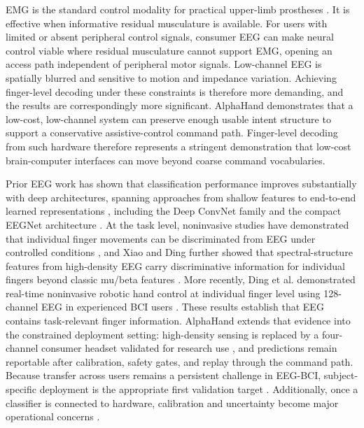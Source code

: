 \documentclass[conference]{IEEEtran}
\begin{document}
EMG is the standard control modality for practical upper-limb prostheses \cite{Scheme2011EMG}. It is effective when informative residual musculature is available. For users with limited or absent peripheral control signals, consumer EEG can make neural control viable where residual musculature cannot support EMG, opening an access path independent of peripheral motor signals. Low-channel EEG is spatially blurred and sensitive to motion and impedance variation. Achieving finger-level decoding under these constraints is therefore more demanding, and the results are correspondingly more significant. AlphaHand demonstrates that a low-cost, low-channel system can preserve enough usable intent structure to support a conservative assistive-control command path. Finger-level decoding from such hardware therefore represents a stringent demonstration that low-cost brain-computer interfaces \cite{Wolpaw2002BCI} can move beyond coarse command vocabularies.

Prior EEG work has shown that classification performance improves substantially with deep architectures, spanning approaches from shallow features to end-to-end learned representations \cite{Lotte2018Review}, including the Deep ConvNet family and the compact EEGNet architecture \cite{Schirrmeister2017Deep,Lawhern2018EEGNet}. At the task level, noninvasive studies have demonstrated that individual finger movements can be discriminated from EEG under controlled conditions \cite{Liao2014FingerEEG,Mohamed2011WristFinger}, and Xiao and Ding further showed that spectral-structure features from high-density EEG carry discriminative information for individual fingers beyond classic mu/beta features \cite{XiaoDing2015FingerSpectral}. More recently, Ding et al. demonstrated real-time noninvasive robotic hand control at individual finger level using 128-channel EEG in experienced BCI users \cite{Ding2025FingerRoboticControl}. These results establish that EEG contains task-relevant finger information. AlphaHand extends that evidence into the constrained deployment setting: high-density sensing is replaced by a four-channel consumer headset validated for research use \cite{Krigolson2017Muse,Cannard2021Muse}, and predictions remain reportable after calibration, safety gates, and replay through the command path. Because transfer across users remains a persistent challenge in EEG-BCI, subject-specific deployment is the appropriate first validation target \cite{Wu2022Transfer}. Additionally, once a classifier is connected to hardware, calibration and uncertainty become major operational concerns \cite{Gal2016Dropout,Guo2017Calibration}.
\end{document}
